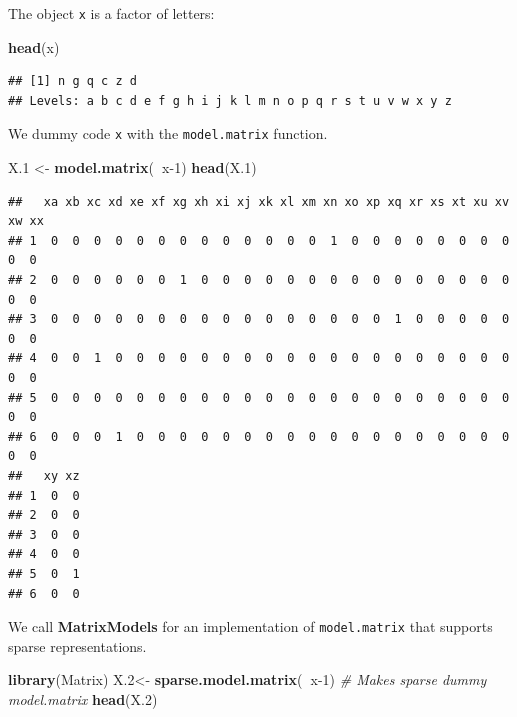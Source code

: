 \documentclass[]{book}
\newenvironment{Shaded}{\begin{snugshade}}{\end{snugshade}}
\newcommand{\CommentTok}[1]{\textcolor[rgb]{0.56,0.35,0.01}{\textit{#1}}}
\newcommand{\DecValTok}[1]{\textcolor[rgb]{0.00,0.00,0.81}{#1}}
\newcommand{\FloatTok}[1]{\textcolor[rgb]{0.00,0.00,0.81}{#1}}
\newcommand{\KeywordTok}[1]{\textcolor[rgb]{0.13,0.29,0.53}{\textbf{#1}}}
\newcommand{\NormalTok}[1]{#1}
\newcommand{\OperatorTok}[1]{\textcolor[rgb]{0.81,0.36,0.00}{\textbf{#1}}}
\newcommand{\StringTok}[1]{\textcolor[rgb]{0.31,0.60,0.02}{#1}}
\theoremstyle{definition}
\theoremstyle{definition}
\theoremstyle{definition}
\theoremstyle{remark}
\begin{document}
The object \texttt{x} is a factor of letters:

\begin{Shaded}
\begin{Highlighting}[]
\KeywordTok{head}\NormalTok{(x)}
\end{Highlighting}
\end{Shaded}

\begin{verbatim}
## [1] n g q c z d
## Levels: a b c d e f g h i j k l m n o p q r s t u v w x y z
\end{verbatim}

We dummy code \texttt{x} with the \texttt{model.matrix} function.

\begin{Shaded}
\begin{Highlighting}[]
\NormalTok{X}\FloatTok{.1}\NormalTok{ <-}\StringTok{ }\KeywordTok{model.matrix}\NormalTok{(}\OperatorTok{~}\NormalTok{x}\DecValTok{-1}\NormalTok{)}
\KeywordTok{head}\NormalTok{(X}\FloatTok{.1}\NormalTok{)}
\end{Highlighting}
\end{Shaded}

\begin{verbatim}
##   xa xb xc xd xe xf xg xh xi xj xk xl xm xn xo xp xq xr xs xt xu xv xw xx
## 1  0  0  0  0  0  0  0  0  0  0  0  0  0  1  0  0  0  0  0  0  0  0  0  0
## 2  0  0  0  0  0  0  1  0  0  0  0  0  0  0  0  0  0  0  0  0  0  0  0  0
## 3  0  0  0  0  0  0  0  0  0  0  0  0  0  0  0  0  1  0  0  0  0  0  0  0
## 4  0  0  1  0  0  0  0  0  0  0  0  0  0  0  0  0  0  0  0  0  0  0  0  0
## 5  0  0  0  0  0  0  0  0  0  0  0  0  0  0  0  0  0  0  0  0  0  0  0  0
## 6  0  0  0  1  0  0  0  0  0  0  0  0  0  0  0  0  0  0  0  0  0  0  0  0
##   xy xz
## 1  0  0
## 2  0  0
## 3  0  0
## 4  0  0
## 5  0  1
## 6  0  0
\end{verbatim}

We call \textbf{MatrixModels} for an implementation of \texttt{model.matrix} that supports sparse representations.

\begin{Shaded}
\begin{Highlighting}[]
\KeywordTok{library}\NormalTok{(Matrix)}
\NormalTok{X}\FloatTok{.2}\NormalTok{<-}\StringTok{ }\KeywordTok{sparse.model.matrix}\NormalTok{(}\OperatorTok{~}\NormalTok{x}\DecValTok{-1}\NormalTok{) }\CommentTok{# Makes sparse dummy model.matrix}
\KeywordTok{head}\NormalTok{(X}\FloatTok{.2}\NormalTok{)}
\end{Highlighting}
\end{Shaded}
\end{document}
